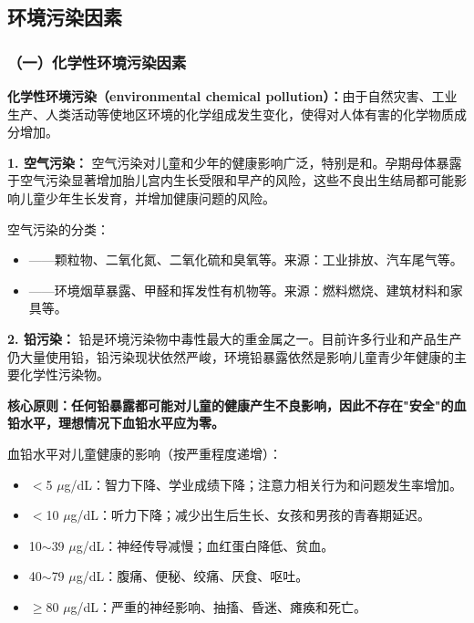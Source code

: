 \subsection{环境污染因素}

\subsubsection{（一）化学性环境污染因素}

\begin{defbox}
\textbf{化学性环境污染（environmental chemical pollution）：}由于自然灾害、工业生产、人类活动等使地区环境的化学组成发生变化，使得对人体有害的化学物质成分增加。
\end{defbox}

\begin{keybox}
\textbf{1. 空气污染：}
空气污染对儿童和少年的健康影响广泛，特别是和。孕期母体暴露于空气污染显著增加胎儿宫内生长受限和早产的风险，这些不良出生结局都可能影响儿童少年生长发育，并增加健康问题的风险。

空气污染的分类：
\begin{itemize}[leftmargin=*]
    \item {}——颗粒物、二氧化氮、二氧化硫和臭氧等。来源：工业排放、汽车尾气等。
    \item {}——环境烟草暴露、甲醛和挥发性有机物等。来源：燃料燃烧、建筑材料和家具等。
\end{itemize}

\textbf{2. 铅污染：}
铅是环境污染物中毒性最大的重金属之一。目前许多行业和产品生产仍大量使用铅，铅污染现状依然严峻，环境铅暴露依然是影响儿童青少年健康的主要化学性污染物。

\textbf{核心原则：任何铅暴露都可能对儿童的健康产生不良影响，因此不存在"安全"的血铅水平，理想情况下血铅水平应为零。}

血铅水平对儿童健康的影响（按严重程度递增）：
\begin{itemize}[leftmargin=*]
    \item $<$5 $\mu$g/dL：智力下降、学业成绩下降；注意力相关行为和问题发生率增加。
    \item $<$10 $\mu$g/dL：听力下降；减少出生后生长、女孩和男孩的青春期延迟。
    \item 10$\sim$39 $\mu$g/dL：神经传导减慢；血红蛋白降低、贫血。
    \item 40$\sim$79 $\mu$g/dL：腹痛、便秘、绞痛、厌食、呕吐。
    \item $\geq$80 $\mu$g/dL：严重的神经影响、抽搐、昏迷、瘫痪和死亡。
\end{itemize}
\end{keybox}

